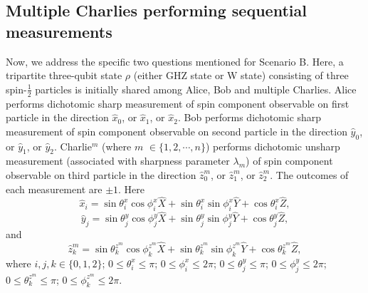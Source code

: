 \documentclass[pra,a4paper,aps,twocolumn,showpacs,superscriptaddress,groupedaddress]{revtex4}
\begin{document}
\subsection{Multiple Charlies performing sequential measurements}
Now, we address the specific two questions mentioned for Scenario B. Here, a tripartite three-qubit state $\rho$ (either GHZ state or W state) consisting of three spin-$\frac{1}{2}$ particles is initially shared among Alice, Bob and multiple Charlies. Alice performs dichotomic sharp measurement of spin component observable on first particle in the direction $\hat{x}_0$, or  $\hat{x}_1$, or $\hat{x}_2$. Bob performs dichotomic sharp measurement of spin component observable on second particle in the direction $\hat{y}_0$, or $\hat{y}_1$, or $\hat{y}_2$.  Charlie$^m$ (where $m$ $\in \{1, 2, \cdots, n\}$) performs dichotomic unsharp measurement (associated with sharpness parameter $\lambda_m$) of spin component observable on third particle in the direction $\hat{z}_0^m$, or $\hat{z}_1^m$, or $\hat{z}_2^m$. The outcomes of each measurement are $\pm1$. Here
\begin{equation}
\label{alice2dir}
\hat{x}_i = \sin \theta^{x}_i \cos \phi^{x}_i \hat{X} + \sin \theta^{x}_i \sin \phi^{x}_i \hat{Y} + \cos \theta^{x}_i \hat{Z},
\end{equation}
\begin{equation}
\label{bob2dir}
\hat{y}_j = \sin \theta^{y}_j \cos \phi^{y}_j \hat{X} + \sin \theta^{y}_j \sin \phi^{y}_j \hat{Y} + \cos \theta^{y}_j \hat{Z},
\end{equation}
and 
\begin{equation}
\label{charlie2mdir}
\hat{z}^m_k = \sin \theta^{z^m}_k \cos \phi^{z^m}_k \hat{X} + \sin \theta^{z^m}_k \sin \phi^{z^m}_k \hat{Y} + \cos \theta^{z^m}_k \hat{Z},
\end{equation}
where $i, j, k \in \{0, 1, 2\}$; $0 \leq \theta^{x}_i  \leq \pi$; $0 \leq \phi^{x}_i  \leq 2 \pi$; $0 \leq \theta^{y}_j  \leq \pi$; $0 \leq \phi^{y}_j  \leq 2 \pi$; $0 \leq \theta^{z^m}_k  \leq \pi$; $0 \leq \phi^{z^m}_k  \leq 2 \pi$.


\end{document}
